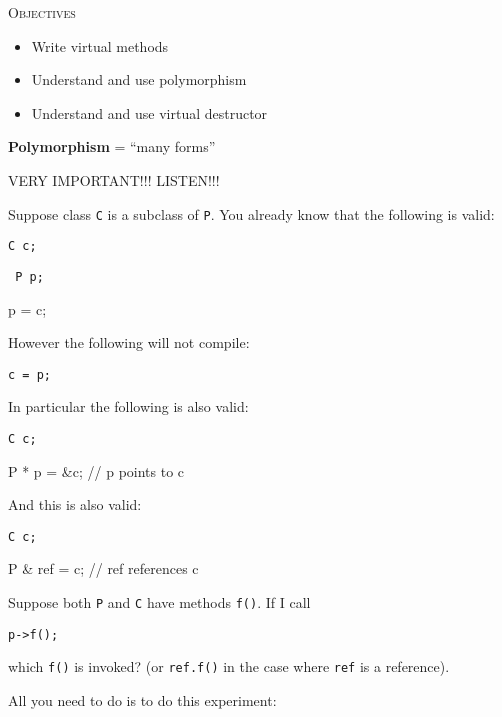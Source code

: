 \newpage{}

\textsc{Objectives}

\begin{itemize}
\item
  Write virtual methods
\item
  Understand and use polymorphism
\item
  Understand and use virtual destructor
\end{itemize}

\newpage{}

\textbf{Polymorphism} = ``many forms''

VERY IMPORTANT!!! LISTEN!!!

Suppose class \texttt{C} is a subclass of \texttt{P}. You already know that
the following is valid:

\texttt{C c; }

\texttt{ P p;}

p = c;

However the following will not compile:

\texttt{c = p;}

In particular the following is also valid:

\texttt{C c; }

P * p = \&c; // p points to c

And this is also valid:

\texttt{C c; }

P \& ref = c; // ref references c

Suppose both \texttt{P} and \texttt{C} have methods \texttt{f()}. If I call

\texttt{p-\textgreater f();}

which \texttt{f()} is invoked? (or \texttt{ref.f()} in the case where
\texttt{ref} is a reference).

All you need to do is to do this experiment:

